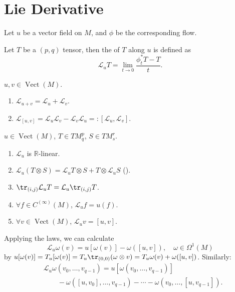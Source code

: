 \documentclass[openany, oneside, a5paper]{book}
\DeclareMathOperator{\Vect}{Vect}
\begin{document}
\section{Lie Derivative}

Let $u$ be a vector field on $M$, and $\phi$ be the corresponding flow.

\begin{definition}
    Let $T$ be a $(p, q)$ tensor, then the  of $T$ along $u$ is defined as
    \begin{equation}\label{eq: lie derivative}
        \mathcal L_u T = \lim_{t \to 0} \frac{\phi^*_t T - T}{t}.
    \end{equation}
\end{definition}

\begin{theorem}
    $u, v \in \Vect(M)$.
    \begin{enumerate}
        \item $\mathcal L_{u + v} = \mathcal L_u + \mathcal L_v$.
        \item $\mathcal L_{[u, v]} = \mathcal L_u \mathcal L_v - \mathcal L_v \mathcal L_u =: [\mathcal L_u, \mathcal L_v]$.
    \end{enumerate}
\end{theorem}

\begin{theorem}
    $u \in \Vect(M)$, $T \in TM^p_q$, $S \in TM^r_s$.
    \begin{enumerate}
        \item $\mathcal L_u $ is $\mathbb R$-linear.
        \item $\mathcal L_u (T \otimes S) = \mathcal L_u T \otimes S + T \otimes \mathcal L_u S$ ().
        \item $\tr_{(i, j)} \mathcal L_u T = \mathcal L_u \tr_{(i, j)} T$.
        \item $\forall f \in C^{(\infty)}(M)$, $\mathcal L_u f = u(f)$.
        \item $\forall v \in \Vect(M)$, $\mathcal L_u v = [u, v]$.
    \end{enumerate}
\end{theorem}

Applying the laws, we can calculate
\begin{equation}
    \mathcal L_u \omega(v) = u[\omega(v)] - \omega([u, v]),
    \quad
    \omega \in \Omega^1(M)
\end{equation}
by $u [\omega(v)] = T_u [\omega(v)] = T_u \tr_{(0, 0)} (\omega \otimes v) = T_u \omega(v) + \omega([u, v])$.
Similarly:
\begin{align}
    &\mathcal L_u \omega(v_0, \ldots, v_{q - 1}) 
    = u[\omega(v_0, \ldots, v_{q - 1})] 
    \\
    &\qquad - \omega([u, v_0], \ldots, v_{q - 1})
    - \cdots - \omega(v_0, \ldots, [u, v_{q - 1}]).
\end{align}
\end{document}
